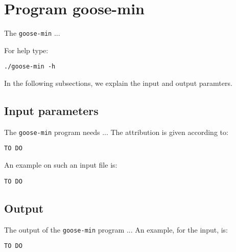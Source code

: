 \section{Program goose-min}
The \texttt{goose-min} ...

For help type:
\begin{lstlisting}
./goose-min -h
\end{lstlisting}
In the following subsections, we explain the input and output paramters.

\subsection*{Input parameters}

The \texttt{goose-min} program needs ...
The attribution is given according to:
\begin{lstlisting}
TO DO
\end{lstlisting}

An example on such an input file is:
\begin{lstlisting}
TO DO
\end{lstlisting}

\subsection*{Output}
The output of the \texttt{goose-min} program ...
An example, for the input, is:
\begin{lstlisting}
TO DO
\end{lstlisting}